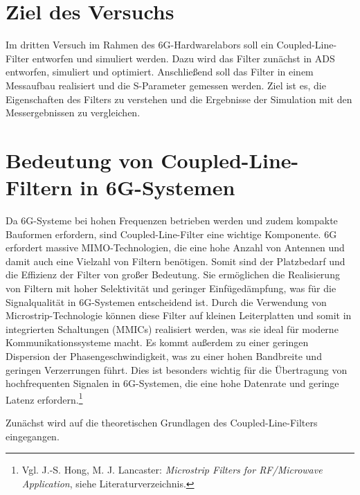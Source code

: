\section{Ziel des Versuchs}
Im dritten Versuch im Rahmen des 6G-Hardwarelabors soll ein Coupled-Line-Filter entworfen und simuliert werden. Dazu wird das Filter zunächst in ADS entworfen, simuliert und optimiert. 
Anschließend soll das Filter in einem Messaufbau realisiert und die S-Parameter gemessen werden. Ziel ist es, die Eigenschaften des Filters zu verstehen und die Ergebnisse der Simulation mit den Messergebnissen zu vergleichen.

\section{Bedeutung von Coupled-Line-Filtern in 6G-Systemen}
Da 6G-Systeme bei hohen Frequenzen betrieben werden und zudem kompakte Bauformen erfordern, sind Coupled-Line-Filter eine wichtige Komponente. 6G erfordert massive MIMO-Technologien, die eine hohe Anzahl von Antennen und damit auch eine Vielzahl von Filtern benötigen.
Somit sind der Platzbedarf und die Effizienz der Filter von großer Bedeutung.
Sie ermöglichen die Realisierung von Filtern mit hoher Selektivität und geringer Einfügedämpfung, was für die Signalqualität in 6G-Systemen entscheidend ist.
Durch die Verwendung von Microstrip-Technologie können diese Filter auf kleinen Leiterplatten und somit in integrierten Schaltungen (MMICs) realisiert werden, was sie ideal für moderne Kommunikationssysteme macht. Es kommt außerdem zu einer geringen Dispersion der Phasengeschwindigkeit, was zu einer hohen Bandbreite und geringen Verzerrungen führt. Dies ist besonders wichtig für die Übertragung von hochfrequenten Signalen in 6G-Systemen, die eine hohe Datenrate und geringe Latenz erfordern.\footnote{Vgl. J.-S. Hong, M. J. Lancaster: \textit{Microstrip Filters for RF/Microwave Application}, siehe Literaturverzeichnis.}

Zunächst wird auf die theoretischen Grundlagen des Coupled-Line-Filters eingegangen.


\clearpage